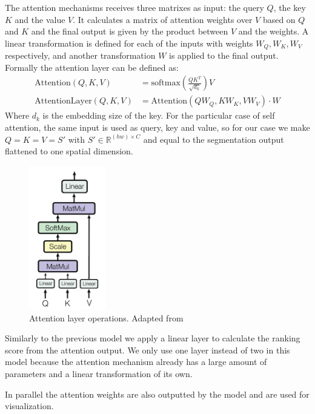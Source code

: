 The attention mechanisms receives three matrixes as input: the query $Q$, the key $K$ and the value
$V$. It calculates a matrix of attention weights over $V$ based on $Q$ and $K$ and the final output
is given by the product between $V$ and the weights. A linear transformation is defined
for each of the inputs with weights $W_Q, W_K, W_V$ respectively, and another transformation $W$
is applied to the final output. Formally the attention layer can be defined as:
\begin{align}
	\text{Attention}(Q,K,V) &= \text{softmax}(\frac{QK^T}{\sqrt{d_k}})V \\
	\text{AttentionLayer}(Q,K,V) &=  \text{Attention}(QW_Q,KW_K,VW_V)\cdot W
\end{align}
Where $d_k$ is the embedding size of the key. For the particular case of self attention,
the same input is used as query, key and value, so for our case we make $Q=K=V=S'$ with
$S' \in \mathbb{R}^{(hw) \times C}$ and equal to the segmentation output flattened to one
spatial dimension.

\begin{figure}[ht]
	\begin{center}
	\includegraphics[width=0.3\textwidth]{./figures/attention.png}
	\caption[Attention Mechanism]{Attention layer operations. Adapted from }
	\label{fig:segrank_1}
	\end{center}
\end{figure}

Similarly to the previous model we apply a linear layer to calculate the ranking score from the attention output.
We only use one layer instead of two in this model because the attention mechanism already has a large amount of parameters and a
linear transformation of its own.

In parallel the attention weights are also outputted by the model and are used for visualization.

